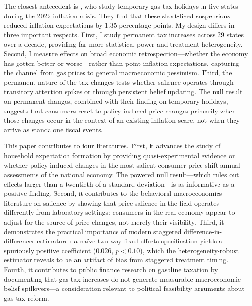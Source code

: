 \documentclass[12pt]{article}
\begin{document}
The closest antecedent is \citet{jo2025fueling}, who study temporary gas tax holidays in five states during the 2022 inflation crisis. They find that these short-lived suspensions reduced inflation expectations by 1.35 percentage points. My design differs in three important respects. First, I study permanent tax increases across 29 states over a decade, providing far more statistical power and treatment heterogeneity. Second, I measure effects on broad economic retrospection---whether the economy has gotten better or worse---rather than point inflation expectations, capturing the channel from gas prices to general macroeconomic pessimism. Third, the permanent nature of the tax changes tests whether salience operates through transitory attention spikes or through persistent belief updating. The null result on permanent changes, combined with their finding on temporary holidays, suggests that consumers react to policy-induced price changes primarily when those changes occur in the context of an existing inflation scare, not when they arrive as standalone fiscal events.

This paper contributes to four literatures. First, it advances the study of household expectation formation \citep{coibion2015information, malmendier2016learning, binder2018inflation, cavallo2017inflation} by providing quasi-experimental evidence on whether policy-induced changes in the most salient consumer price shift annual assessments of the national economy. The powered null result---which rules out effects larger than a twentieth of a standard deviation---is as informative as a positive finding. Second, it contributes to the behavioral macroeconomics literature on salience \citep{bordalo2013salience, gabaix2014sparsity} by showing that price salience in the field operates differently from laboratory settings: consumers in the real economy appear to adjust for the source of price changes, not merely their visibility. Third, it demonstrates the practical importance of modern staggered difference-in-differences estimators \citep{callaway2021difference, sun2021estimating, goodman2021difference}: a na\"ive two-way fixed effects specification yields a spuriously positive coefficient ($0.026$, $p < 0.10$), which the heterogeneity-robust estimator reveals to be an artifact of bias from staggered treatment timing. Fourth, it contributes to public finance research on gasoline taxation \citep{li2014gasoline, rivers2017salience} by documenting that gas tax increases do not generate measurable macroeconomic belief spillovers---a consideration relevant to political feasibility arguments about gas tax reform.
\end{document}
